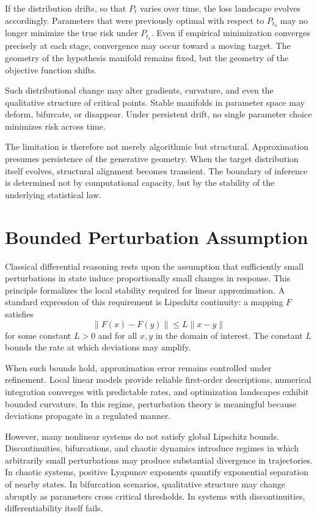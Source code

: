 \documentclass[12pt]{book}
\begin{document}
If the distribution drifts, so that $P_t$ varies over time, the loss landscape evolves accordingly. Parameters that were previously optimal with respect to $P_{t_0}$ may no longer minimize the true risk under $P_{t_1}$. Even if empirical minimization converges precisely at each stage, convergence may occur toward a moving target. The geometry of the hypothesis manifold remains fixed, but the geometry of the objective function shifts.

Such distributional change may alter gradients, curvature, and even the qualitative structure of critical points. Stable manifolds in parameter space may deform, bifurcate, or disappear. Under persistent drift, no single parameter choice minimizes risk across time.

The limitation is therefore not merely algorithmic but structural. Approximation presumes persistence of the generative geometry. When the target distribution itself evolves, structural alignment becomes transient. The boundary of inference is determined not by computational capacity, but by the stability of the underlying statistical law.

\section{Bounded Perturbation Assumption}

Classical differential reasoning rests upon the assumption that sufficiently small perturbations in state induce proportionally small changes in response. This principle formalizes the local stability required for linear approximation. A standard expression of this requirement is Lipschitz continuity: a mapping $F$ satisfies
\[
\|F(x) - F(y)\| \le L \|x-y\|
\]
for some constant $L > 0$ and for all $x,y$ in the domain of interest. The constant $L$ bounds the rate at which deviations may amplify.

When such bounds hold, approximation error remains controlled under refinement. Local linear models provide reliable first-order descriptions, numerical integration converges with predictable rates, and optimization landscapes exhibit bounded curvature. In this regime, perturbation theory is meaningful because deviations propagate in a regulated manner.

However, many nonlinear systems do not satisfy global Lipschitz bounds. Discontinuities, bifurcations, and chaotic dynamics introduce regimes in which arbitrarily small perturbations may produce substantial divergence in trajectories. In chaotic systems, positive Lyapunov exponents quantify exponential separation of nearby states. In bifurcation scenarios, qualitative structure may change abruptly as parameters cross critical thresholds. In systems with discontinuities, differentiability itself fails.
\end{document}
